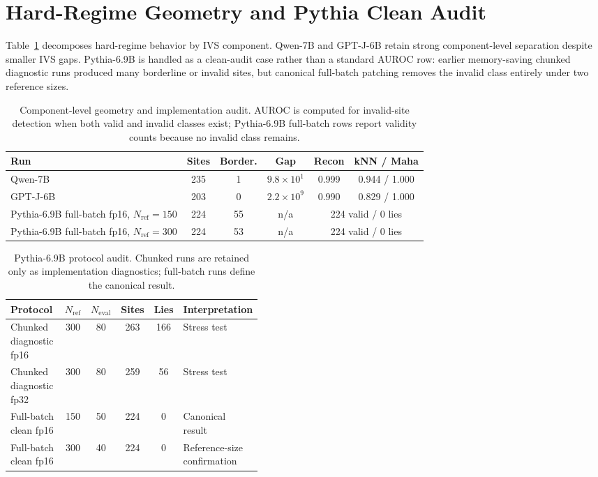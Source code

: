 \documentclass{article}
\begin{document}
\section{Hard-Regime Geometry and Pythia Clean Audit}
\label{app:geometry_audit}

Table~\ref{tab:geometry_audit} decomposes hard-regime behavior by IVS component. Qwen-7B and GPT-J-6B retain strong component-level separation despite smaller IVS gaps. Pythia-6.9B is handled as a clean-audit case rather than a standard AUROC row: earlier memory-saving chunked diagnostic runs produced many borderline or invalid sites, but canonical full-batch patching removes the invalid class entirely under two reference sizes.

\begin{table}[h]
\caption{Component-level geometry and implementation audit. AUROC is computed for invalid-site detection when both valid and invalid classes exist; Pythia-6.9B full-batch rows report validity counts because no invalid class remains.}
\label{tab:geometry_audit}
\begin{center}\small
\begin{tabular}{lccccc}
\toprule
\textbf{Run} & \textbf{Sites} & \textbf{Border.} & \textbf{Gap} & \textbf{Recon} & \textbf{kNN / Maha} \\
\midrule
Qwen-7B & 235 & 1 & $9.8{\times}10^1$ & 0.999 & 0.944 / 1.000 \\
GPT-J-6B & 203 & 0 & $2.2{\times}10^9$ & 0.990 & 0.829 / 1.000 \\
Pythia-6.9B full-batch fp16, $N_\text{ref}=150$ & 224 & 55 & n/a & \multicolumn{2}{c}{224 valid / 0 lies} \\
Pythia-6.9B full-batch fp16, $N_\text{ref}=300$ & 224 & 53 & n/a & \multicolumn{2}{c}{224 valid / 0 lies} \\
\bottomrule
\end{tabular}
\end{center}
\end{table}

\begin{table}[h]
\caption{Pythia-6.9B protocol audit. Chunked runs are retained only as implementation diagnostics; full-batch runs define the canonical result.}
\label{tab:pythia_protocol_audit}
\begin{center}\small
\begin{tabular}{p{0.24\linewidth}ccccp{0.18\linewidth}}
\toprule
\textbf{Protocol} & \textbf{$N_\text{ref}$} & \textbf{$N_\text{eval}$} & \textbf{Sites} & \textbf{Lies} & \textbf{Interpretation} \\
\midrule
Chunked diagnostic fp16 & 300 & 80 & 263 & 166 & Stress test \\
Chunked diagnostic fp32 & 300 & 80 & 259 & 56 & Stress test \\
Full-batch clean fp16 & 150 & 50 & 224 & 0 & Canonical result \\
Full-batch clean fp16 & 300 & 40 & 224 & 0 & Reference-size confirmation \\
\bottomrule
\end{tabular}
\end{center}
\end{table}
\end{document}
